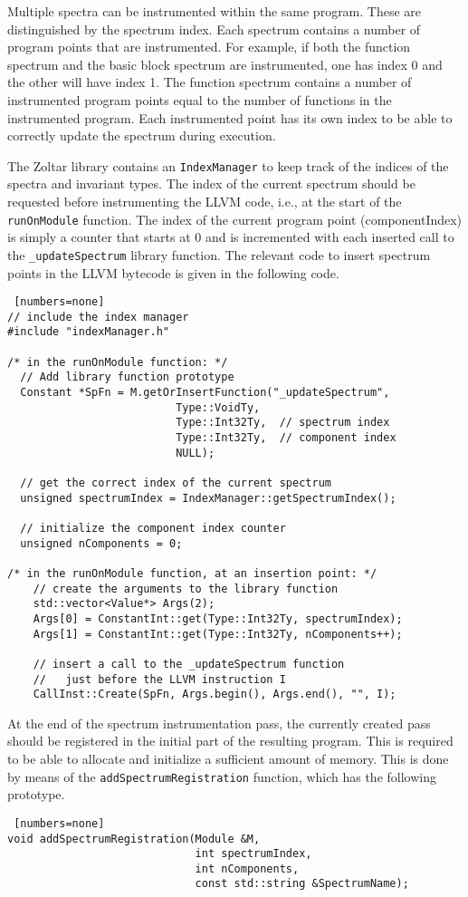 Multiple spectra can be instrumented within the same program.
These are distinguished by the spectrum index.
Each spectrum contains a number of program points that are instrumented.
For example, if both the function spectrum and the basic block spectrum 
are instrumented, one has index 0 and the other will have index 1.
The function spectrum contains a number of instrumented program points
equal to the number of functions in the instrumented program.
Each instrumented point has its own index to be able to correctly update
the spectrum during execution.

The Zoltar library contains an \verb|IndexManager| to keep track of the
indices of the spectra and invariant types.
The index of the current spectrum should be requested before instrumenting
the LLVM code, i.e., at the start of the \verb|runOnModule| function.
The index of the current program point (componentIndex) is simply a counter
that starts at 0 and is incremented with each inserted call to the
\verb|_updateSpectrum| library function.
The relevant code to insert spectrum points in the LLVM bytecode is
given in the following code.
\begin{lstlisting} [numbers=none]
// include the index manager
#include "indexManager.h"

/* in the runOnModule function: */
  // Add library function prototype
  Constant *SpFn = M.getOrInsertFunction("_updateSpectrum", 
                          Type::VoidTy, 
                          Type::Int32Ty,  // spectrum index
                          Type::Int32Ty,  // component index
                          NULL);

  // get the correct index of the current spectrum
  unsigned spectrumIndex = IndexManager::getSpectrumIndex();

  // initialize the component index counter
  unsigned nComponents = 0;

/* in the runOnModule function, at an insertion point: */
    // create the arguments to the library function
    std::vector<Value*> Args(2);
    Args[0] = ConstantInt::get(Type::Int32Ty, spectrumIndex);
    Args[1] = ConstantInt::get(Type::Int32Ty, nComponents++);
    
    // insert a call to the _updateSpectrum function
    //   just before the LLVM instruction I
    CallInst::Create(SpFn, Args.begin(), Args.end(), "", I);
\end{lstlisting}

At the end of the spectrum instrumentation pass, 
the currently created pass should be registered in the initial
part of the resulting program.
This is required to be able to allocate and initialize 
a sufficient amount of memory.
This is done by means of the \verb|addSpectrumRegistration|
function, which has the following prototype.
\begin{lstlisting} [numbers=none]
void addSpectrumRegistration(Module &M,
                             int spectrumIndex, 
                             int nComponents, 
                             const std::string &SpectrumName);
\end{lstlisting}

